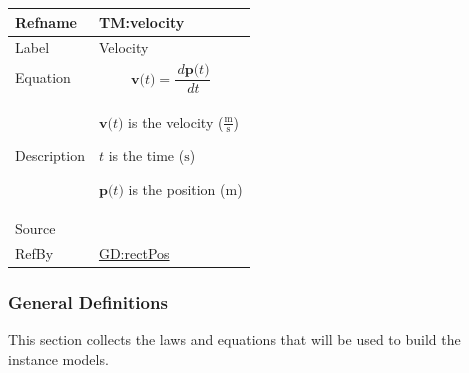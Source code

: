 \documentclass[12pt]{article}
\begin{document}
\medskip
\noindent
\begin{minipage}{\textwidth}
\begin{tabular}{>{\raggedright}p{}>{\raggedright\arraybackslash}p{}}
\toprule \textbf{Refname} & \textbf{TM:velocity}
\label{TM:velocity}
\\ \midrule
Label & Velocity
        
\\ \midrule
Equation & \begin{displaymath}
           \symbf{v}\text{(}t\text{)}=\frac{\,d\symbf{p}\text{(}t\text{)}}{\,dt}
           \end{displaymath}
\\ \midrule
Description & \begin{symbDescription}
              \item{$\symbf{v}\text{(}t\text{)}$ is the velocity ($\frac{\text{m}}{\text{s}}$)}
              \item{$t$ is the time (${\text{s}}$)}
              \item{$\symbf{p}\text{(}t\text{)}$ is the position (${\text{m}}$)}
              \end{symbDescription}
\\ \midrule
Source & \cite{velocityWiki}
         
\\ \midrule
RefBy & \hyperref[GD:rectPos]{GD:rectPos}
        
\\ \bottomrule
\end{tabular}
\end{minipage}

\subsubsection{General Definitions}
\label{Sec:GDs}
This section collects the laws and equations that will be used to build the instance models.
\end{document}
